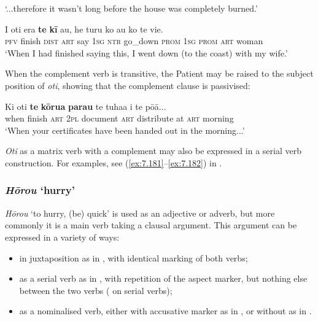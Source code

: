 \glt 
‘...therefore it wasn’t long before the house was completely burned.’ \textstyleExampleref{[R250.120]} 
\z

\ea\label{ex:11.53}
\gll I oti era \textbf{te} \textbf{kī} au, he turu ko au ko te vi{\ꞌ}e. \\
\textsc{pfv} finish \textsc{dist} \textsc{art} say \textsc{1sg} \textsc{ntr} go\_down \textsc{prom} \textsc{1sg} \textsc{prom} \textsc{art} woman \\

\glt
‘When I had finished saying this, I went down (to the coast) with my wife.’ \textstyleExampleref{[Egt-02.066]}
\z

When the complement verb is transitive, the Patient may be raised to the subject position of \textit{oti}, showing that the complement clause is passivised: 

\ea\label{ex:11.54}
\gll Ki oti \textbf{te} \textbf{kōrua} \textbf{parau} te tuha{\ꞌ}a {\ꞌ}i te pō{\ꞌ}ā...  \\
when finish \textsc{art} \textsc{2pl} document \textsc{art} distribute at \textsc{art} morning  \\

\glt 
‘When your certificates have been handed out in the morning...’ \textstyleExampleref{[R315.368]} 
\z

\textit{Oti} as a matrix verb with a complement may also be expressed in a serial verb construction. For examples, see (\ref{ex:7.181}–\ref{ex:7.182}) in .

\subsubsection{\textit{Hōrou} ‘hurry’}\label{sec:11.3.2.3}
\textit{Hōrou} ‘to hurry, (be) quick’ is used as an adjective or adverb, but more commonly it is a main verb taking a clausal argument. This argument can be expressed in a variety of ways: 

\begin{itemize}
\item 
in juxtaposition as in , with identical marking of both verbs; 

\item 
as a serial verb as in , with repetition of the aspect marker, but nothing else between the two verbs ( on serial verbs); 

\item 
as a nominalised verb, either with accusative marker as in , or without as in .

\end{itemize}

